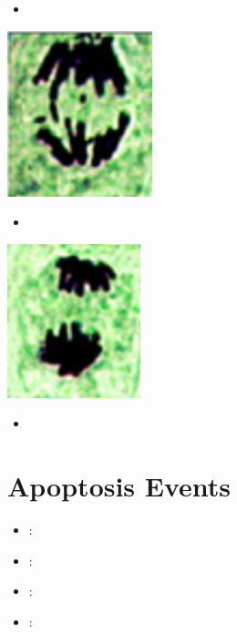   \begin{itemize}
    \item 
  \end{itemize}
  \begin{center}
    \includegraphics[scale=0.5]{images/week-1-mp4.png}
  \end{center}
  \begin{itemize}
    \item 
  \end{itemize}
  \begin{center}
    \includegraphics[scale=0.5]{images/week-1-mp5.png}
  \end{center}
  \begin{itemize}
    \item 
  \end{itemize}

  
\section{Apoptosis Events}\label{Apoptosis Events}
\begin{itemize}
  \item {}:
  \item {}:
  \item {}:
  \item {}:
\end{itemize}

